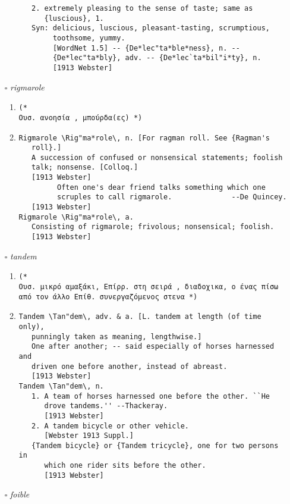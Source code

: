 \documentclass{article}
\begin{document}
\begin{itemize}
\begin{enumerate}
{\begin{lstlisting}
   2. extremely pleasing to the sense of taste; same as
      {luscious}, 1.
   Syn: delicious, luscious, pleasant-tasting, scrumptious,
        toothsome, yummy.
        [WordNet 1.5] -- {De*lec"ta*ble*ness}, n. --
        {De*lec"ta*bly}, adv. -- {De*lec`ta*bil"i*ty}, n.
        [1913 Webster]
\end{lstlisting}}
\end{enumerate}
\item[$\square$] \emph{ rigmarole }
\begin{enumerate}
\item{
\begin{lstlisting}
(* 
Ουσ. ανοησία , μπούρδα(ες) *)
\end{lstlisting}}
\item{
\begin{lstlisting}
Rigmarole \Rig"ma*role\, n. [For ragman roll. See {Ragman's
   roll}.]
   A succession of confused or nonsensical statements; foolish
   talk; nonsense. [Colloq.]
   [1913 Webster]
         Often one's dear friend talks something which one
         scruples to call rigmarole.              --De Quincey.
   [1913 Webster]
Rigmarole \Rig"ma*role\, a.
   Consisting of rigmarole; frivolous; nonsensical; foolish.
   [1913 Webster]
\end{lstlisting}}
\end{enumerate}
\item[$\square$] \emph{ tandem }
\begin{enumerate}
\item{
\begin{lstlisting}
(* 
Ουσ. μικρό αμαξάκι, Επίρρ. στη σειρά , διαδοχικα, ο ένας πίσω από τον άλλο Επίθ. συνεργαζόμενος στενα *)
\end{lstlisting}}
\item{
\begin{lstlisting}
Tandem \Tan"dem\, adv. & a. [L. tandem at length (of time only),
   punningly taken as meaning, lengthwise.]
   One after another; -- said especially of horses harnessed and
   driven one before another, instead of abreast.
   [1913 Webster]
Tandem \Tan"dem\, n.
   1. A team of horses harnessed one before the other. ``He
      drove tandems.'' --Thackeray.
      [1913 Webster]
   2. A tandem bicycle or other vehicle.
      [Webster 1913 Suppl.]
   {Tandem bicycle} or {Tandem tricycle}, one for two persons in
      which one rider sits before the other.
      [1913 Webster]
\end{lstlisting}}
\end{enumerate}
\item[$\square$] \emph{ foible }

\end{itemize}
\end{document}
